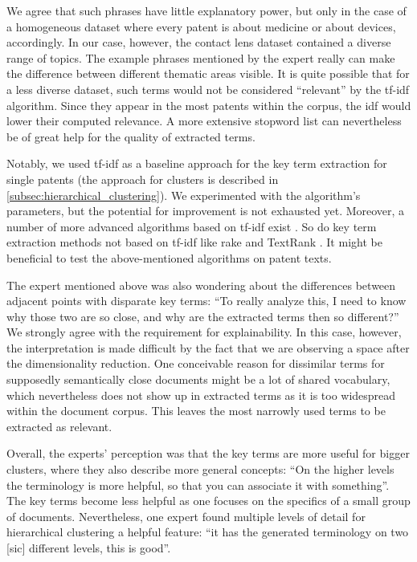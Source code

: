 We agree that such phrases have little explanatory power, but only in the case of a homogeneous dataset where every patent is about medicine or about devices, accordingly.
In our case, however, the contact lens dataset contained a diverse range of topics.
The example phrases mentioned by the expert really can make the difference between different thematic areas visible.
It is quite possible that for a less diverse dataset, such terms would not be considered ``relevant'' by the \gls{tf-idf} algorithm. 
Since they appear in the most patents within the corpus, the \gls{idf} would lower their computed relevance.
A more extensive stopword list can nevertheless be of great help for the quality of extracted terms.

Notably, we used \gls{tf-idf} as a baseline approach for the key term extraction for single patents (the approach for clusters is described in \autoref{subsec:hierarchical_clustering}).
We experimented with the algorithm's parameters, but the potential for improvement is not exhausted yet.
Moreover, a number of more advanced algorithms based on \gls{tf-idf} exist \cite{Liu2010} \cite{Kim2009}.
So do key term extraction methods not based on \gls{tf-idf} like \gls{rake} \cite{rose} and TextRank \cite{Mihalcea2004}.
It might be beneficial to test the above-mentioned algorithms on patent texts.

The expert mentioned above was also wondering about the differences between adjacent points with disparate key terms: ``To really analyze this, I need to know why those two are so close, and why are the extracted terms then so different?''
We strongly agree with the requirement for explainability.
In this case, however, the interpretation is made difficult by the fact that we are observing a space after the dimensionality reduction.
One conceivable reason for dissimilar terms for supposedly semantically close documents might be a lot of shared vocabulary, which nevertheless does not show up in extracted terms as it is too widespread within the document corpus.
This leaves the most narrowly used terms to be extracted as relevant.

Overall, the experts' perception was that the key terms are more useful for bigger clusters, where they also describe more general concepts: ``On the higher levels the terminology is more helpful, so that you can associate it with something''.
The key terms become less helpful as one focuses on the specifics of a small group of documents.
Nevertheless, one expert found multiple levels of detail for hierarchical clustering a helpful feature: ``it has the generated terminology on two [sic] different levels, this is good''.

